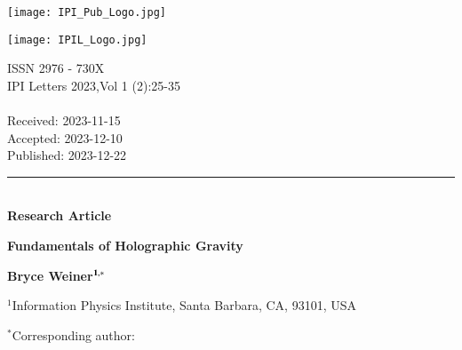 \documentclass[11pt,english,twoside]{article}
\begin{document}
\thispagestyle{empty}
\setcounter{page}{1}

\pagestyle{fancy}
\fancyhf{}
\fancyhead{}
\fancyfoot{}
\fancyfoot[LE,RO]{\thepage}
\renewcommand{\headrulewidth}{0.4pt}

\begin{minipage}{0.14\textwidth}
\texttt{[image: IPI\_Pub\_Logo.jpg]}
\end{minipage}
\hfill
\begin{minipage}{0.5\textwidth}
\texttt{[image: IPIL\_Logo.jpg]}
\end{minipage}
\begin{minipage}{0.3\textwidth}
\begin{flushright}
{\scriptsize
ISSN 2976 - 730X\\
IPI Letters 2023,Vol 1 (2):25-35\\
\href{https://doi.org/10.59973/ipil.xx}{\color{blue}{https://doi.org/10.59973/ipil.xx}}\\
\medskip
Received: 2023-11-15\\
Accepted: 2023-12-10\\
Published: 2023-12-22\\
}\end{flushright}
\end{minipage}

\vspace{0.5cm}

\par\noindent\rule{\textwidth}{0.5pt}\\
{\color{red}\textbf{Research Article}}

\begin{center}
\vspace{0.5cm}
  {\huge {\bf Fundamentals of Holographic Gravity}}
  \vspace{0.5cm}
\end{center}

\noindent
{\large {\bf Bryce Weiner$^\bold{1,*}$} }

\vspace{0.1in}

\noindent
{\footnotesize $^1$Information Physics Institute, Santa Barbara, CA, 93101, USA

\vspace{0.1in}

\noindent
$^*$Corresponding author: \href{mailto:bryce.physics@gmail.com} {\color{blue}{bryce.physics@gmail.com}}
}
\end{document}
